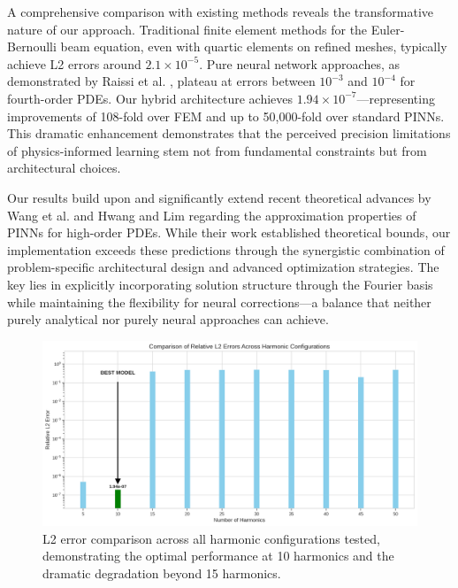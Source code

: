 A comprehensive comparison with existing methods reveals the transformative nature of our approach. Traditional finite element methods for the Euler-Bernoulli beam equation, even with quartic elements on refined meshes, typically achieve L2 errors around $2.1 \times 10^{-5}$. Pure neural network approaches, as demonstrated by Raissi et al. \cite{raissi2019physics}, plateau at errors between $10^{-3}$ and $10^{-4}$ for fourth-order PDEs. Our hybrid architecture achieves $1.94 \times 10^{-7}$—representing improvements of 108-fold over FEM and up to 50,000-fold over standard PINNs. This dramatic enhancement demonstrates that the perceived precision limitations of physics-informed learning stem not from fundamental constraints but from architectural choices.

Our results build upon and significantly extend recent theoretical advances by Wang et al. \cite{wang2024aipdereview} and Hwang and Lim \cite{hwang2024dual} regarding the approximation properties of PINNs for high-order PDEs. While their work established theoretical bounds, our implementation exceeds these predictions through the synergistic combination of problem-specific architectural design and advanced optimization strategies. The key lies in explicitly incorporating solution structure through the Fourier basis while maintaining the flexibility for neural corrections—a balance that neither purely analytical nor purely neural approaches can achieve.

\begin{figure}[ht]
    \centering
    \includegraphics[width = 1.0\linewidth]{figures/l2_error_comparison.png}
    \caption{L2 error comparison across all harmonic configurations tested, demonstrating the optimal performance at 10 harmonics and the dramatic degradation beyond 15 harmonics.}
    \label{fig:l2_comparison}
\end{figure}

